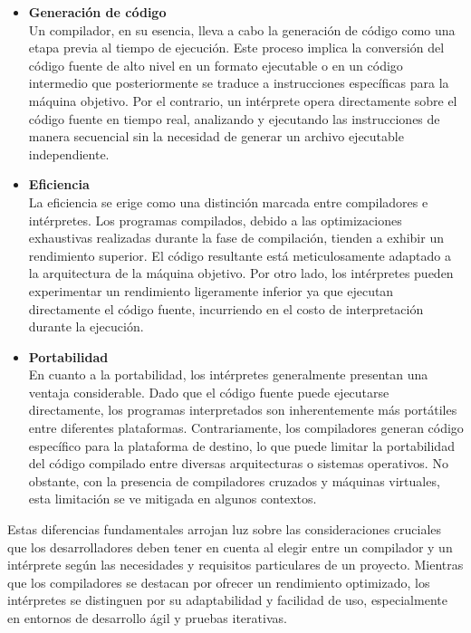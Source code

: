 \begin{itemize}
  \item \textbf{Generación de código} \\
  Un compilador, en su esencia, lleva a cabo la generación de código como una etapa previa al tiempo de ejecución. Este proceso implica la conversión del código fuente de alto nivel en un formato ejecutable o en un código intermedio que posteriormente se traduce a instrucciones específicas para la máquina objetivo. Por el contrario, un intérprete opera directamente sobre el código fuente en tiempo real, analizando y ejecutando las instrucciones de manera secuencial sin la necesidad de generar un archivo ejecutable independiente. \parencite{AlfonsecaMoreno2006}
  \item \textbf{Eficiencia} \\
  La eficiencia se erige como una distinción marcada entre compiladores e intérpretes. Los programas compilados, debido a las optimizaciones exhaustivas realizadas durante la fase de compilación, tienden a exhibir un rendimiento superior. El código resultante está meticulosamente adaptado a la arquitectura de la máquina objetivo. Por otro lado, los intérpretes pueden experimentar un rendimiento ligeramente inferior ya que ejecutan directamente el código fuente, incurriendo en el costo de interpretación durante la ejecución. \parencite{AlfonsecaMoreno2006}
  \item \textbf{Portabilidad} \\
  En cuanto a la portabilidad, los intérpretes generalmente presentan una ventaja considerable. Dado que el código fuente puede ejecutarse directamente, los programas interpretados son inherentemente más portátiles entre diferentes plataformas. Contrariamente, los compiladores generan código específico para la plataforma de destino, lo que puede limitar la portabilidad del código compilado entre diversas arquitecturas o sistemas operativos. No obstante, con la presencia de compiladores cruzados y máquinas virtuales, esta limitación se ve mitigada en algunos contextos. \parencite{AlfonsecaMoreno2006}
\end{itemize}

Estas diferencias fundamentales arrojan luz sobre las consideraciones cruciales que los desarrolladores deben tener en cuenta al elegir entre un compilador y un intérprete según las necesidades y requisitos particulares de un proyecto. Mientras que los compiladores se destacan por ofrecer un rendimiento optimizado, los intérpretes se distinguen por su adaptabilidad y facilidad de uso, especialmente en entornos de desarrollo ágil y pruebas iterativas.


